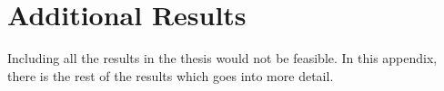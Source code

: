 \chapter{Additional Results}

Including all the results in the thesis would not be feasible. In this appendix, there is the rest of the results which goes into more detail.


